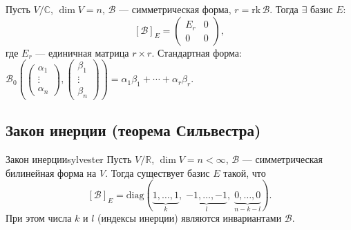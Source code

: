 \begin{Corollary}{}{}
	Пусть $V/\mathbb{C}$, $\dim V = n$, $\mathcal{B}$ — симметрическая форма, $r = \mathrm{rk}\,\mathcal{B}$.
	Тогда $\exists$ базис $E\colon$
	\[
	[\mathcal{B}]_E = \begin{pmatrix} E_r & 0 \\ 0 & 0 \end{pmatrix},
	\]
	где $E_r$ — единичная матрица $r \times r$.
	Стандартная форма: $\mathcal{B}_0\!\left(\begin{pmatrix}\alpha_1\\\vdots\\\alpha_n\end{pmatrix},\begin{pmatrix}\beta_1\\\vdots\\\beta_n\end{pmatrix}\right) = \alpha_1\beta_1 + \cdots + \alpha_r\beta_r$.
\end{Corollary}

\subsection{Закон инерции (теорема Сильвестра)}

\begin{Theorem}{Закон инерции}{sylvester}
	Пусть $V/\mathbb{R}$, $\dim V = n < \infty$, $\mathcal{B}$ — симметрическая билинейная форма на $V$.
	Тогда существует базис $E$ такой, что
	\[
	[\mathcal{B}]_E = \mathrm{diag}(\underbrace{1,\ldots,1}_{k},\;
	\underbrace{-1,\ldots,-1}_{l},\;
	\underbrace{0,\ldots,0}_{n-k-l}). \tag{$*$}
	\]
	При этом числа $k$ и $l$ (индексы инерции) являются инвариантами $\mathcal{B}$.
\end{Theorem}

